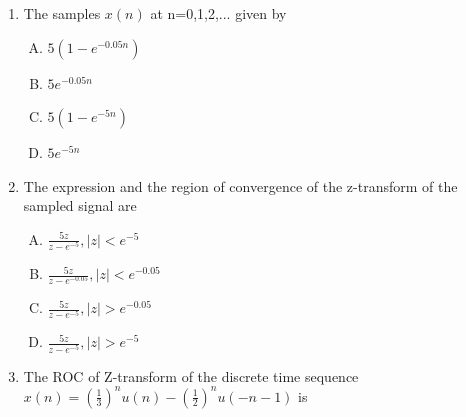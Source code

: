 \documentclass[journal,12pt,twocolumn]{IEEEtran}
\begin{document}
\begin{enumerate}
\item  The samples $x(n)$ at n=0,1,2,... given by


\begin{enumerate}[(A)]

\item $5(1-e^{-0.05n})$

\item $5e^{-0.05n}$

\item $ 5(1-e^{-5n})$
\item $ 5e^{-5n}$



\end{enumerate}

\item The expression and the region of convergence of the z-transform of the sampled signal are

\begin{enumerate}[(A)]

\item $ \frac{5z}{z-e^{-5}}, |z|<e^{-5}$

\item $ \frac{5z}{z-e^{-0.05}}, |z|<e^{-0.05}$

\item $ \frac{5z}{z-e^{-5}}, |z|>e^{-0.05}$

\item  $ \frac{5z}{z-e^{-5}}, |z|>e^{-5}$



\end{enumerate}

 


%
%
%
%
%

\item The ROC of Z-transform of the discrete time sequence $x(n)=(\frac{1}{3})^{n}u(n)-(\frac{1}{2})^{n}u(-n-1)$ is


\end{enumerate}
\end{document}
